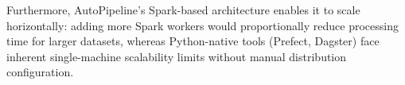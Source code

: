 Furthermore, AutoPipeline's Spark-based architecture enables it to scale horizontally: adding more Spark workers would proportionally reduce processing time for larger datasets, whereas Python-native tools (Prefect, Dagster) face inherent single-machine scalability limits without manual distribution configuration.
